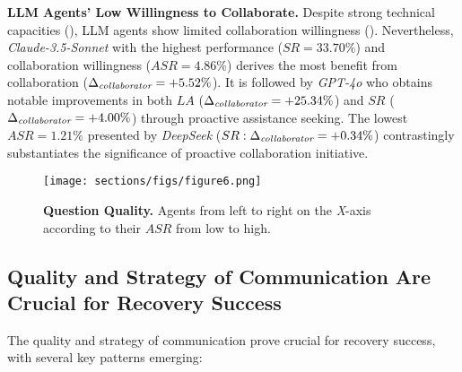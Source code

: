\textbf{LLM Agents' Low Willingness to Collaborate.}
Despite strong technical capacities (), LLM agents show limited collaboration willingness ().
Nevertheless, \textit{Claude-3.5-Sonnet} with the highest performance ($SR=33.70\%$) and collaboration willingness ($ASR=4.86\%$) derives the most benefit from collaboration ($\Delta_{\textit{\text{collaborator}}}=+5.52\%$).
It is followed by \textit{GPT-4o} who obtains notable improvements in both $LA$ ($\Delta_{\textit{\text{collaborator}}}=+25.34\%$) and $SR$ ($\Delta_{\textit{\text{collaborator}}}=+4.00\%$) through proactive assistance seeking.
The lowest $ASR=1.21\%$ presented by \textit{DeepSeek} ($SR: \Delta_{\textit{\text{collaborator}}}=+0.34\%$) contrastingly substantiates the significance of proactive collaboration initiative.






\begin{figure}[H]
    \centering
    \vspace{-0.5em}  %
    \texttt{[image: sections/figs/figure6.png]}
    \vspace{-1.8em}
    \caption{\textbf{Question Quality.} Agents from left to right on the \textit{X}-axis according to their $ASR$ from low to high.}
    \vspace{-1.5em}  %
    \label{fig:figure 6 (Time Allocation) (Question Quality)}
\end{figure}






\subsection{Quality and Strategy of Communication Are Crucial for Recovery Success
}
\label{Section: Collaborative Effectiveness} 

The quality and strategy of communication prove crucial for recovery success, with several key patterns emerging:

